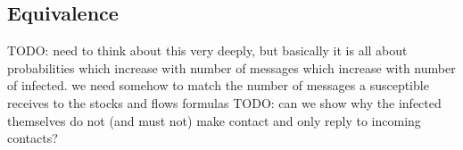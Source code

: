 \subsection{Equivalence}
TODO: need to think about this very deeply, but basically it is all about probabilities which increase with number of messages which increase with number of infected. we need somehow to match the number of messages a susceptible receives to the stocks and flows formulas
TODO: can we show why the infected themselves do not (and must not) make contact and only reply to incoming contacts?